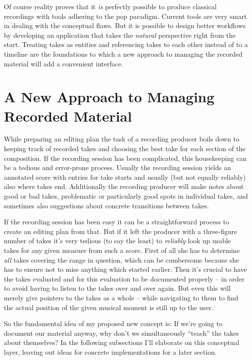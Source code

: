 \documentclass[11pt,a4paper]{article}
\begin{document}
Of course reality proves that it \emph{is} perfectly possible to produce classical
recordings with tools adhering to the pop paradigm. Current tools are very
smart in dealing with the conceptual flaws.
But it is possible to design better workflows by developing an application that
takes the \emph{natural} perspective right from the start.
Treating takes as entities and referencing takes to each other instead of to a
timeline are the foundations to which a new approach to managing the recorded
material will add a convenient interface.


\section{A New Approach to Managing Recorded Material}

While preparing an editing plan the task of a recording producer boils down to
keeping track of recorded takes and choosing the best take for each section of
the composition.
If the recording session has been complicated, this housekeeping can be a
tedious and error-prone process.
Usually the recording session yields an annotated score with entries for take
starts and usually (but not equally reliably) also where takes end.
Additionally the recording producer will make notes about good or bad takes,
problematic or particularly good spots in individual takes, and sometimes also
suggestions about concrete transitions between takes.

If the recording session has been easy it can be a straightforward process to
create an editing plan from that.
But if it left the producer with a three-figure number of takes it's very
tedious (to say the least) to \emph{reliably} look up usable takes for any given
measure from such a score.
First of all she has to determine \emph{all} takes covering the range in
question, which can be cumbersome because she has to ensure not to miss anything
which started earlier.
Then it's crucial to have the takes evaluated and for this evaluation to be
documented properly -- in order to avoid having to listen to the takes over and
over again.
But even this will merely give pointers to the takes as a whole -- while
navigating to them to find the actual position of the given musical moment is
still up to the user.

So the fundamental idea of my proposed new concept is:
If we're going to document our material anyway, why don't we simultaneously
“teach” the takes about themselves?
In the following subsections I'll elaborate on this conceptual layer, leaving out
ideas for concrete implementations for a later section.
\end{document}
